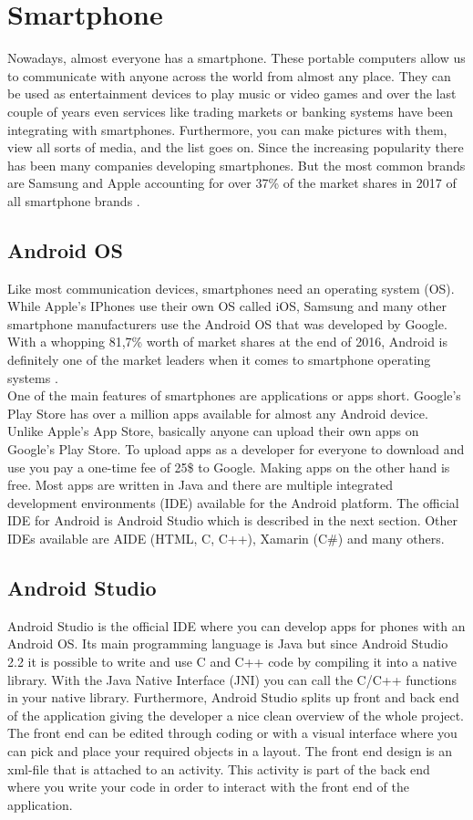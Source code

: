 \documentclass[a4paper, 11pt]{report}
\begin{document}
\section{Smartphone}
Nowadays, almost everyone has a smartphone. These portable computers allow us to communicate with anyone across the world from almost any place. They can be used as entertainment devices to play music or video games and over the last couple of years even services like trading markets or banking systems have been integrating with smartphones. Furthermore, you can make pictures with them, view all sorts of media, and the list goes on. Since the increasing popularity there has been many companies developing smartphones. But the most common brands are Samsung and Apple accounting for over 37\% of the market shares in 2017 of all smartphone brands \cite{SmartphoneShares}.
	\subsection{Android OS}
Like most communication devices, smartphones need an operating system (OS). While Apple's IPhones use their own OS called iOS, Samsung and many other smartphone manufacturers use the Android OS that was developed by Google. With a whopping 81,7\% worth of market shares at the end of 2016, Android is definitely one of the market leaders when it comes to smartphone operating systems \cite{OSShares}.\\
One of the main features of smartphones are applications or apps short. Google's Play Store has over a million apps available for almost any Android device. Unlike Apple's App Store, basically anyone can upload their own apps on Google's Play Store. To upload apps as a developer for everyone to download and use you pay a one-time fee of 25\$ to Google. Making apps on the other hand is free. Most apps are written in Java and there are multiple integrated development environments (IDE) available for the Android platform. The official IDE for Android is Android Studio which is described in the next section. Other IDEs available are AIDE (HTML, C, C++), Xamarin (C\#) and many others.
	\subsection{Android Studio}
Android Studio is the official IDE where you can develop apps for phones with an Android OS. Its main programming language is Java but since Android Studio 2.2 it is possible to write and use C and C++ code by compiling it into a native library. With the Java Native Interface (JNI) you can call the C/C++ functions in your native library. Furthermore, Android Studio splits up front and back end of the application giving the developer a nice clean overview of the whole project. The front end can be edited through coding or with a visual interface where you can pick and place your required objects in a layout. The front end design is an xml-file that is attached to an activity. This activity is part of the back end where you write your code in order to interact with the front end of the application.
\end{document}
